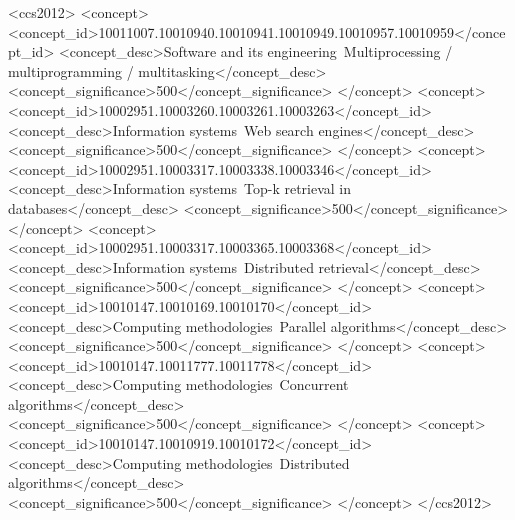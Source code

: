 \documentclass[sigplan]{acmart}
\begin{document}
\begin{CCSXML}
<ccs2012>
<concept>
<concept_id>10011007.10010940.10010941.10010949.10010957.10010959</concept_id>
<concept_desc>Software and its engineering~Multiprocessing / multiprogramming / multitasking</concept_desc>
<concept_significance>500</concept_significance>
</concept>
<concept>
<concept_id>10002951.10003260.10003261.10003263</concept_id>
<concept_desc>Information systems~Web search engines</concept_desc>
<concept_significance>500</concept_significance>
</concept>
<concept>
<concept_id>10002951.10003317.10003338.10003346</concept_id>
<concept_desc>Information systems~Top-k retrieval in databases</concept_desc>
<concept_significance>500</concept_significance>
</concept>
<concept>
<concept_id>10002951.10003317.10003365.10003368</concept_id>
<concept_desc>Information systems~Distributed retrieval</concept_desc>
<concept_significance>500</concept_significance>
</concept>
<concept>
<concept_id>10010147.10010169.10010170</concept_id>
<concept_desc>Computing methodologies~Parallel algorithms</concept_desc>
<concept_significance>500</concept_significance>
</concept>
<concept>
<concept_id>10010147.10011777.10011778</concept_id>
<concept_desc>Computing methodologies~Concurrent algorithms</concept_desc>
<concept_significance>500</concept_significance>
</concept>
<concept>
<concept_id>10010147.10010919.10010172</concept_id>
<concept_desc>Computing methodologies~Distributed algorithms</concept_desc>
<concept_significance>500</concept_significance>
</concept>
</ccs2012>
\end{CCSXML}



\raggedbottom
\maketitle









 
\end{document}
